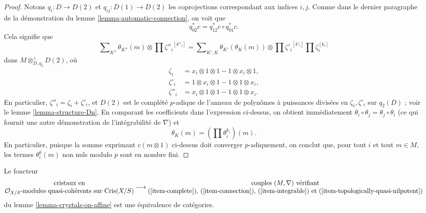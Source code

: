 \begin{proof}
\medskip\noindent
Notons $q_i : D \to D(2)$ et $q_{ij} : D(1) \to D(2)$ les coprojections
correspondant aux indices $i, j$. Comme dans le dernier paragraphe de la démonstration du
lemme \ref{lemma-automatic-connection},
on voit que
$$
q_{02}^*c = q_{12}^*c \circ q_{01}^*c.
$$
Cela signifie que
$$
\sum\nolimits_{K''} \theta_{K''}(m) \otimes \prod {\zeta''_i}^{[k''_i]}
=
\sum\nolimits_{K', K} \theta_{K'}(\theta_K(m))
\otimes \prod {\zeta'_i}^{[k'_i]} \prod \zeta_i^{[k_i]}
$$
dans $M \otimes^\wedge_{D, q_2} D(2)$, où
\begin{align*}
\zeta_i & = x_i \otimes 1 \otimes 1 - 1 \otimes x_i \otimes 1,\\
\zeta'_i & = 1 \otimes x_i \otimes 1 - 1 \otimes 1 \otimes x_i,\\
\zeta''_i & = x_i \otimes 1 \otimes 1 - 1 \otimes 1 \otimes x_i.
\end{align*}
En particulier, $\zeta''_i = \zeta_i + \zeta'_i$, et
$D(2)$ est le complété $p$-adique de l'anneau de polynômes
à puissances divisées en $\zeta_i, \zeta'_i$ sur $q_2(D)$ ; voir le lemme \ref{lemma-structure-Dn}.
En comparant les coefficients dans l'expression ci-dessus, on obtient immédiatement
$\theta_i \circ \theta_j = \theta_j \circ \theta_i$
(ce qui fournit une autre démonstration de l'intégrabilité de $\nabla$) et
$$
\theta_K(m) = (\prod \theta_i^{k_i})(m).
$$
En particulier, puisque la somme exprimant $c(m \otimes 1)$ ci-dessus doit converger
$p$-adiquement, on conclut que, pour tout $i$ et tout $m \in M$, les termes
$\theta_i^k(m)$ non nuls modulo $p$ sont en nombre fini.
\end{proof}

\begin{proposition}
\label{proposition-crystals-on-affine}
Le foncteur
$$
\begin{matrix}
\text{cristaux en} \\
\mathcal{O}_{X/S}\text{-modules quasi-cohérents sur }\text{Cris}(X/S)
\end{matrix}
\longrightarrow
\begin{matrix}
\text{couples }(M, \nabla)\text{ vérifiant} \\
\text{(\ref{item-complete}), (\ref{item-connection}),
(\ref{item-integrable}) et (\ref{item-topologically-quasi-nilpotent})}
\end{matrix}
$$
du lemme \ref{lemma-crystals-on-affine}
est une équivalence de catégories.
\end{proposition}

